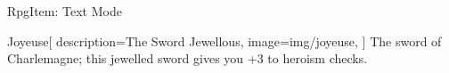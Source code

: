 \begin{ExampleBlock}{RpgItem: Text Mode}
\begin{RpgItem}{Joyeuse}[
    description={The Sword Jewellous},
    image={img/joyeuse},
]
    The sword of Charlemagne; this jewelled sword gives you +3 to heroism checks.
\end{RpgItem}

\end{ExampleBlock}
